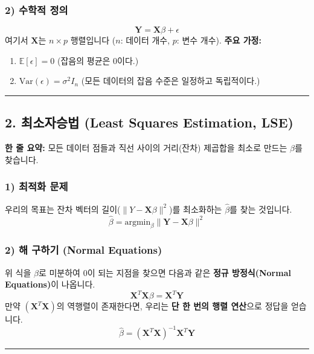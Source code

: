 \documentclass[11pt,a4paper]{book}
\theoremstyle{definition}
\begin{document}
\subsubsection*{2) 수학적 정의}
$$ \mathbf{Y} = \mathbf{X}\beta + \epsilon $$
여기서 $\mathbf{X}$는 $n \times p$ 행렬입니다 ($n$: 데이터 개수, $p$: 변수 개수).
\textbf{주요 가정:}
\begin{enumerate}
    \item $\mathbb{E}[\epsilon] = 0$ (잡음의 평균은 0이다.)
    \item $\text{Var}(\epsilon) = \sigma^2 I_n$ (모든 데이터의 잡음 수준은 일정하고 독립적이다.)
\end{enumerate}

\vspace{0.5cm}\hrule\vspace{0.5cm}

\subsection{2. 최소자승법 (Least Squares Estimation, LSE)}


\begin{conceptbox}[title={개념 2: 오차의 제곱을 최소화하라}]
\textbf{한 줄 요약:} 모든 데이터 점들과 직선 사이의 거리(잔차) 제곱합을 최소로 만드는 $\beta$를 찾습니다.
\end{conceptbox}

\subsubsection*{1) 최적화 문제}
우리의 목표는 잔차 벡터의 길이($\| Y - \mathbf{X}\beta \|^2$)를 최소화하는 $\hat{\beta}$를 찾는 것입니다.
$$ \hat{\beta} = \text{argmin}_{\beta} \| \mathbf{Y} - \mathbf{X}\beta \|^2 $$

\subsubsection*{2) 해 구하기 (Normal Equations)}
위 식을 $\beta$로 미분하여 0이 되는 지점을 찾으면 다음과 같은 \textbf{정규 방정식(Normal Equations)}이 나옵니다.
$$ \mathbf{X}^T \mathbf{X} \beta = \mathbf{X}^T \mathbf{Y} $$
만약 $(\mathbf{X}^T \mathbf{X})$의 역행렬이 존재한다면, 우리는 \textbf{단 한 번의 행렬 연산}으로 정답을 얻습니다.
$$ \hat{\beta} = (\mathbf{X}^T \mathbf{X})^{-1} \mathbf{X}^T \mathbf{Y} $$

\vspace{0.5cm}\hrule\vspace{0.5cm}
\end{document}
